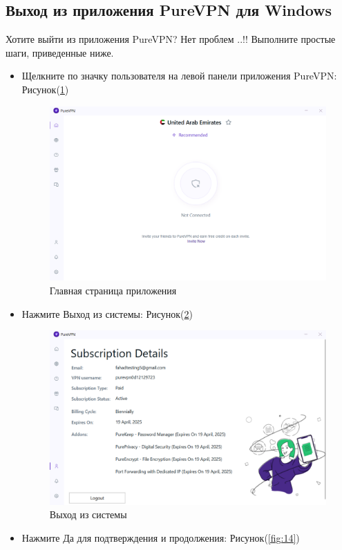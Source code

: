 \subsection{Выход из приложения PureVPN для Windows} 
Хотите выйти из приложения PureVPN? Нет проблем ..!! Выполните простые шаги, приведенные ниже.
\begin{itemize}
\item Щелкните по значку пользователя на левой панели приложения PureVPN:  Рисунок(\ref{fig:12})
\begin{figure}[H]
\includegraphics[width=12cm]{9.png}
\centering
\caption{Главная страница приложения}
\label{fig:12}
\end{figure}
\item Нажмите Выход из системы:  Рисунок(\ref{fig:13})
\begin{figure}[H]
\includegraphics[width=12cm]{11.png}
\centering
\caption{Выход из системы}
\label{fig:13}
\end{figure}
\item Нажмите Да для подтверждения и продолжения:  Рисунок(\ref{fig:14})
\begin{figure}[H]

\end{figure}
\end{itemize}
